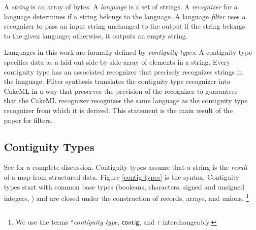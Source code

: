 \newcommand{\konst}[1]{\ensuremath{\mathsf{#1}}}
\newcommand{\imp}{\Rightarrow}
\newcommand{\lval}{\ensuremath{\mathit{lval}}}
\newcommand{\set}[1]{\ensuremath{\{ {#1} \}}}
\newcommand{\kstar}[1]{\ensuremath{{#1}^{*}}}
\newcommand{\Lang}[1]{\ensuremath{{\mathcal L}({#1})}}
\newcommand{\LangTheta}[1]{\ensuremath{{\mathcal L}_{\theta}({#1})}}
\newcommand{\itelse}[3]{\mbox{$\mathtt{if}\ {#1}\ \mathtt{then}\ {#2}\ \mathtt{else}\ {#3}$}}


\makeatletter
\newcommand*{\bdiv}{%
  \nonscript\mskip-\medmuskip\mkern5mu%
  \mathbin{\operator@font div}\penalty900\mkern5mu%
  \nonscript\mskip-\medmuskip
}
\makeatother

A \emph{string} is an array of bytes. A \emph{language} is a set of strings. A \emph{recognizer} for a language determines if a string belongs to the language.  A language \emph{filter} uses a recognizer to pass an input string unchanged to the output if the string belongs to the given language; otherwise, it outputs an empty string. 

Languages in this work are formally defined by \emph{contiguity types}. A contiguity type specifies data as a laid out side-by-side array of elements in a string. Every contiguity type has an associated recognizer that precisely recognizes strings in the language. Filter synthesis translates the contiguity type recognizer into CakeML in a way that preserves the precision of the recognizer to guarantees that the CakeML recognizer recognizes the same language as the contiguity type recognizer from which it is derived. This statement is the main result of the paper for filters.

\subsection{Contiguity Types}

See \cite{contiguity} for a complete discussion. Contiguity types assume that a string is the \emph{result} of a
map from structured data. Figure \ref{contig-types} is the syntax. Contiguity types start with common base types (booleans,
characters, signed and unsigned integers, \etc) and are closed under
the construction of records, arrays, and unions. \footnote{We use
the terms ``\emph{contiguity type}, \konst{contig}, and $\tau$
interchangeably.}

